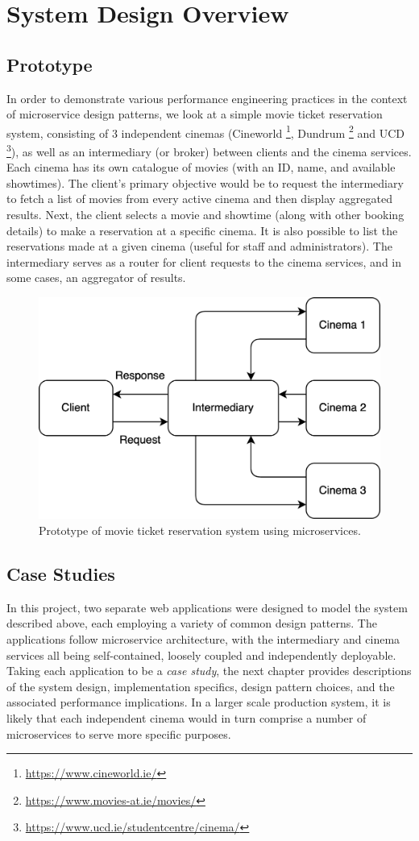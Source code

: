 \chapter{System Design Overview}

\section{Prototype}

In order to demonstrate various performance engineering practices in the context of microservice design patterns, we look at a simple movie ticket reservation system, consisting of 3 independent cinemas (Cineworld \footnote{\url{https://www.cineworld.ie/}}, Dundrum \footnote{\url{https://www.movies-at.ie/movies/}} and UCD \footnote{\url{https://www.ucd.ie/studentcentre/cinema/}}), as well as an intermediary (or broker) between clients and the cinema services. Each cinema has its own catalogue of movies (with an ID, name, and available showtimes). The client's primary objective would be to request the intermediary to fetch a list of movies from every active cinema and then display aggregated results. Next, the client selects a movie and showtime (along with other booking details) to make a reservation at a specific cinema. It is also possible to list the reservations made at a given cinema (useful for staff and administrators). The intermediary serves as a router for client requests to the cinema services, and in some cases, an aggregator of results.


\begin{figure}[H]
  \centering
  \includegraphics[width=0.5\linewidth]{./assets/diagrams/outline-arch.png}
  \caption{Prototype of movie ticket reservation system using microservices.}
  \label{fig:outline-arch}
\end{figure}

\section{Case Studies}

In this project, two separate web applications were designed to model the system described above, each employing a variety of common design patterns. The applications follow microservice architecture, with the intermediary and cinema services all being self-contained, loosely coupled and independently deployable. Taking each application to be a \textit{case study}, the next chapter provides descriptions of the system design, implementation specifics, design pattern choices, and the associated performance implications. In a larger scale production system, it is likely that each independent cinema would in turn comprise a number of microservices to serve more specific purposes.


